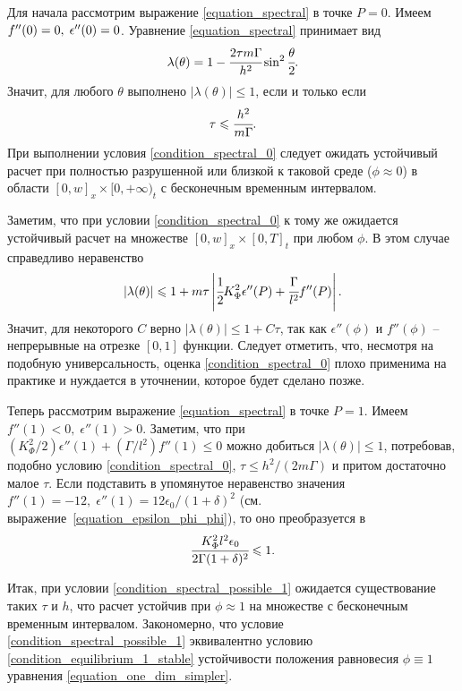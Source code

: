 \documentclass[a4paper,12pt]{article}
\newcommand*{\hm}[1]{#1\nobreak\discretionary{}
{\hbox{$\mathsurround=0pt #1$}}{}}
\theoremstyle{plain}
\theoremstyle{definition}
\begin{document}
Для начала рассмотрим выражение \eqref{equation_spectral} в точке $P = 0$. Имеем $f''(0) = 0, \; \epsilon''(0) \hm = 0$. Уравнение \eqref{equation_spectral} принимает вид
$$\lambda(\theta) = 1 - \cfrac{2 \tau m \Gamma}{h^2} \sin^2 \cfrac{\theta}{2} \text{.}$$
Значит, для любого $\theta$ выполнено $|\lambda(\theta)| \leqslant 1$, если и только если
\begin{equation}
     \tau \leqslant \cfrac{h^2}{m \Gamma} \text{.}
     \label{condition_spectral_0}
\end{equation}
При выполнении условия \eqref{condition_spectral_0} следует ожидать устойчивый расчет при полностью разрушенной или близкой к таковой среде ($\phi \approx 0$) в области $[0, w]_x \times [0, +\infty)_t$ с бесконечным временным интервалом.

Заметим, что при условии \eqref{condition_spectral_0} к тому же ожидается устойчивый расчет на множестве $[0, w]_x \times [0, T]_t$ при любом $\phi$. В этом случае справедливо неравенство
$$|\lambda(\theta)| \leqslant 1 + m \tau \left| \cfrac{1}{2} K_\Phi^2 \epsilon''(P) + \cfrac{\Gamma}{l^2} f''(P) \right| \text{.}$$
Значит, для некоторого $C$ верно $|\lambda(\theta)| \leqslant 1 + C \tau$, так как $\epsilon''(\phi)$ и $f''(\phi)$ -- непрерывные на отрезке $[0, 1]$ функции. Следует отметить, что, несмотря на подобную универсальность, оценка \eqref{condition_spectral_0} плохо применима на практике и нуждается в уточнении, которое будет сделано позже.

Теперь рассмотрим выражение \eqref{equation_spectral} в точке $P = 1$. Имеем $f''(1) < 0, \; \epsilon''(1) > 0$. Заметим, что при $(K_\Phi^2/2) \epsilon''(1) + (\Gamma/l^2) f''(1) \leqslant 0$ можно добиться $|\lambda(\theta)| \leqslant 1$, потребовав, подобно условию \eqref{condition_spectral_0}, $\tau \leqslant h^2/(2m \Gamma)$ и притом достаточно малое $\tau$. Если подставить в упомянутое неравенство значения $f''(1) = -12, \; \epsilon''(1) = 12 \epsilon_0/(1 + \delta)^2$ (см. выражение~\eqref{equation_epsilon_phi_phi}), то оно преобразуется в
\begin{equation}
    \cfrac{K_\Phi^2 l^2 \epsilon_0}{2 \Gamma (1 + \delta)^2} \leqslant 1 \text{.}
    \label{condition_spectral_possible_1}
\end{equation}

Итак, при условии \eqref{condition_spectral_possible_1} ожидается существование таких $\tau$ и $h$, что расчет устойчив при $\phi \approx 1$ на множестве с бесконечным временным интервалом. Закономерно, что условие \eqref{condition_spectral_possible_1} эквивалентно условию \eqref{condition_equilibrium_1_stable} устойчивости положения равновесия $\phi \equiv 1$ уравнения \eqref{equation_one_dim_simpler}.
\end{document}
